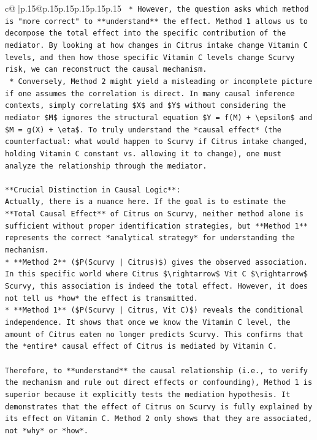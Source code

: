 \documentclass{article}
\begin{document}
{\begin{supertabular}{c@{$\;$}|p{.15\linewidth}@{}p{.15\linewidth}p{.15\linewidth}p{.15\linewidth}p{.15\linewidth}p{.15\linewidth}}
{{{\texttt{    *   However, the question asks which method is "more correct" to **understand** the effect. Method 1 allows us to decompose the total effect into the specific contribution of the mediator. By looking at how changes in Citrus intake change Vitamin C levels, and then how those specific Vitamin C levels change Scurvy risk, we can reconstruct the causal mechanism.} \\
\texttt{    *   Conversely, Method 2 might yield a misleading or incomplete picture if one assumes the correlation is direct. In many causal inference contexts, simply correlating \$X\$ and \$Y\$ without considering the mediator \$M\$ ignores the structural equation \$Y = f(M) + \textbackslash{}epsilon\$ and \$M = g(X) + \textbackslash{}eta\$. To truly understand the *causal effect* (the counterfactual: what would happen to Scurvy if Citrus intake changed, holding Vitamin C constant vs. allowing it to change), one must analyze the relationship through the mediator.} \\
\\ 
\texttt{**Crucial Distinction in Causal Logic**:} \\
\texttt{Actually, there is a nuance here. If the goal is to estimate the **Total Causal Effect** of Citrus on Scurvy, neither method alone is sufficient without proper identification strategies, but **Method 1** represents the correct *analytical strategy* for understanding the mechanism.} \\
\texttt{*   **Method 2** (\$P(Scurvy | Citrus)\$) gives the observed association. In this specific world where Citrus \$\textbackslash{}rightarrow\$ Vit C \$\textbackslash{}rightarrow\$ Scurvy, this association is indeed the total effect. However, it does not tell us *how* the effect is transmitted.} \\
\texttt{*   **Method 1** (\$P(Scurvy | Citrus, Vit C)\$) reveals the conditional independence. It shows that once we know the Vitamin C level, the amount of Citrus eaten no longer predicts Scurvy. This confirms that the *entire* causal effect of Citrus is mediated by Vitamin C.} \\
\\ 
\texttt{Therefore, to **understand** the causal relationship (i.e., to verify the mechanism and rule out direct effects or confounding), Method 1 is superior because it explicitly tests the mediation hypothesis. It demonstrates that the effect of Citrus on Scurvy is fully explained by its effect on Vitamin C. Method 2 only shows that they are associated, not *why* or *how*.} \\
}}}
\end{supertabular}}
\end{document}
